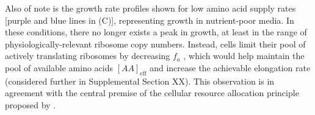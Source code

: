 {Also of note is the growth rate profiles shown for low amino acid supply rates
[purple and blue lines in (C)], representing growth
in nutrient-poor media. In these conditions, there no longer exists a peak in
growth, at least in the range of physiologically-relevant  ribosome copy
numbers. Instead, cells limit their pool of actively translating ribosomes  by
decreasing $f_a$ \citep{dai2016}, which would help maintain the pool of
available amino acids $[AA]_\text{eff}$ and increase the achievable elongation
rate (considered further in Supplemental Section XX). This observation is in
agreement with the central premise of the cellular resource allocation principle
proposed by \cite{scott2010, klumpp2009,klumpp2014, hui2015}.





}
